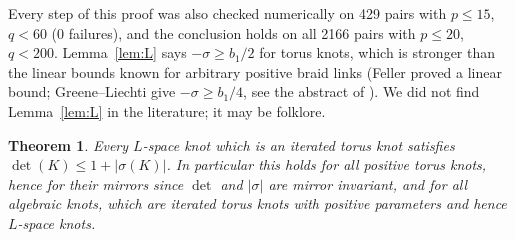 \documentclass[11pt]{article}
\newtheorem{theorem}{Theorem}
\theoremstyle{definition}
\begin{document}
\noindent Every step of this proof was also checked numerically on 429 pairs with $p \le 15$, $q < 60$ (0 failures), and the conclusion
holds on all 2166 pairs with $p \le 20$, $q < 200$. Lemma~\ref{lem:L} says $-\sigma \ge b_1/2$ for torus knots, which is stronger than the linear bounds known for
arbitrary positive braid links (Feller proved a linear bound; Greene--Liechti give $-\sigma \ge b_1/4$, see the
abstract of \cite{GL}). We did not find Lemma~\ref{lem:L} in the literature; it may be folklore.

\begin{theorem}\label{thm}
Every $L$-space knot which is an iterated torus knot satisfies $\det(K) \le 1 + |\sigma(K)|$. In particular this holds
for all positive torus knots, hence for their mirrors since $\det$ and $|\sigma|$ are mirror invariant, and for all
algebraic knots, which are iterated torus knots with positive parameters \cite{EN} and hence $L$-space knots.
\end{theorem}
\end{document}
